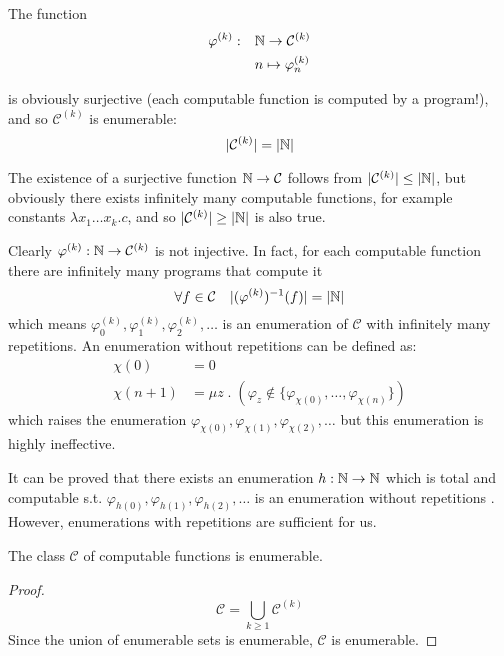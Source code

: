\begin{observation}
  The function \[
  \begin{split}
    \varphi^{(k)} : & \quad \mathbb{N} \to \mathcal{C}^{(k)} \\
    & \quad n \mapsto \varphi_n^{(k)}
  \end{split}
\]

is obviously surjective (each computable function is computed by a
program!), and so $\mathcal{C}^{(k)}$ is enumerable:
\[|\mathcal{C}^{(k)}| = |\mathbb{N}|\]

The existence of a surjective function $\mathbb{N} \to \mathcal{C}$
follows from $|\mathcal{C}^{(k)}| \leq |\mathbb{N}|$, but obviously there
exists infinitely many computable functions, for example constants
$\lambda x_1 \dots x_k . c$, and so $|\mathcal{C}^{(k)}| \geq |\mathbb{N}|$
is also true.

Clearly $\varphi^{(k)} : \mathbb{N} \to \mathcal{C}^{(k)}$ is not
injective. In fact, for each computable function there are infinitely
many programs that compute it
\[\forall f \in \mathcal{C}  \quad |(\varphi^{(k)})^{-1}(f)| =
  |\mathbb{N}|\] which means
\(\varphi_0^{(k)}, \varphi_1^{(k)}, \varphi_2^{(k)}, \dots\) is an
enumeration of $\mathcal{C}$ with infinitely many repetitions. An
enumeration without repetitions can be defined as:
\begin{align*}
\chi(0) &= 0 \\
  \chi(n+1) &= \mu z \; . \; (\varphi_z \notin \{\varphi_{\chi(0)},
  \dots, \varphi_{\chi(n)}\})
\end{align*}
which raises the enumeration
$\varphi_{\chi(0)}, \varphi_{\chi(1)}, \varphi_{\chi(2)}, \dots$
but this enumeration is highly ineffective.

It can be proved that there exists an enumeration
$h : \mathbb{N} \to \mathbb{N}$ which is total and computable s.t.
$\varphi_{h(0)}, \varphi_{h(1)}, \varphi_{h(2)}, \dots$ is an
enumeration without repetitions \cite{firedberg:1958}. However,
enumerations with repetitions are sufficient for us.
\end{observation}

\begin{theorem}[$|\mathcal{C}| = |\nat|$]
  The class $\mathcal{C}$ of computable functions is enumerable.
  \begin{proof}
    \[ \mathcal{C} = \bigcup_{k \geq 1}\mathcal{C}^{(k)} \] Since the
    union of enumerable sets is enumerable, $\mathcal{C}$ is
    enumerable.
  \end{proof}
\end{theorem}


